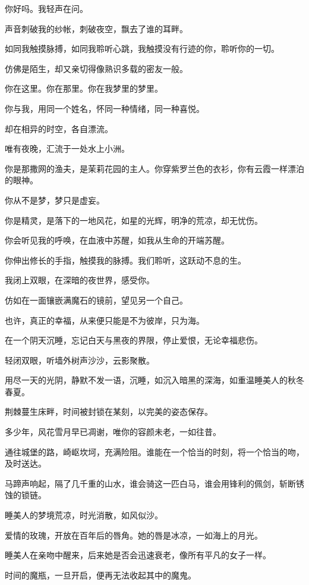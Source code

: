 \documentclass[12pt,a4paper]{article}
\def\blankrev{\vspace{1ex}}									%
\begin{document}
		你好吗。我轻声在问。\par
		声音刺破我的纱帐，刺破夜空，飘去了谁的耳畔。

		如同我触摸脉搏，如同我聆听心跳，我触摸没有行迹的你，聆听你的一切。\par
		仿佛是陌生，却又亲切得像熟识多载的密友一般。

		你在这里。你在那里。你在我梦里的梦里。\par
		你与我，用同一个姓名，怀同一种情绪，同一种喜悦。\par
		却在相异的时空，各自漂流。\par
		唯有夜晚，汇流于一处水上小洲。

		你是那撒网的渔夫，是茉莉花园的主人。你穿紫罗兰色的衣衫，你有云霞一样漂泊的眼神。\par
		你从不是梦，梦只是虚妄。\par
		你是精灵，是落下的一地风花，如星的光辉，明净的荒凉，却无忧伤。\par
		你会听见我的呼唤，在血液中苏醒，如我从生命的开端苏醒。\par
		你伸出修长的手指，触摸我的脉搏。我们聆听，这跃动不息的生。

		我闭上双眼，在深暗的夜世界，感受你。\par
		仿如在一面镶嵌满魔石的镜前，望见另一个自己。

	\endwriting



		也许，真正的幸福，从来便只能是不为彼岸，只为海。


		\blankrev
		在一个阴天沉睡，忘记白天与黑夜的界限，停止爱恨，无论幸福悲伤。\par
		轻闭双眼，听墙外树声沙沙，云影聚散。\par
		用尽一天的光阴，静默不发一语，沉睡，如沉入暗黑的深海，如重温睡美人的秋冬春夏。\par
		荆棘蔓生床畔，时间被封锁在某刻，以完美的姿态保存。\par
		多少年，风花雪月早已凋谢，唯你的容颜未老，一如往昔。\par
		通往城堡的路，崎岖坎坷，充满险阻。谁能在一个恰当的时刻，将一个恰当的吻，及时送达。\par
		马蹄声响起，隔了几千重的山水，谁会骑这一匹白马，谁会用锋利的佩剑，斩断锈蚀的锁链。\par
		睡美人的梦境荒凉，时光消散，如风似沙。\par
		爱情的玫瑰，开放在百年后的唇角。她的唇是冰凉，一如海上的月光。\par
		睡美人在亲吻中醒来，后来她是否会迅速衰老，像所有平凡的女子一样。\par
		时间的魔瓶，一旦开启，便再无法收起其中的魔鬼。
\end{document}
